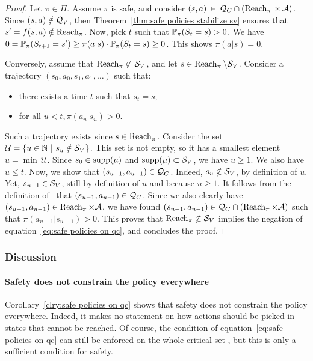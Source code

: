 \begin{proof}
	Let $\pi\in\Pi$. Assume $\pi$ is safe, and consider $(s, a)\,\in\, \QC \cap (\reach_\pi\,\times\,\A)$. Since $(s, a) \notin \QV$, then Theorem~\ref{thm:safe policies stabilize sv} ensures that $s' = f(s, a)\notin\reach_\pi$. Now, pick $t$ such that $\P_\pi(S_t = s) > 0$. We have $0 = \P_\pi(S_{t+1} = s') \geq \pi(a|s)\cdot\P_\pi(S_t = s) \geq 0$. This shows $\pi(a|s) = 0$.\par
	Conversely, assume that $\reach_\pi\not\subset\SV$, and let $s\in\reach_\pi\setminus\SV$. Consider a trajectory $(s_0, a_0, s_1, a_1, \hdots)$ such that:
	\begin{itemize}
		\item there exists a time $t$ such that $s_t = s$;
		\item for all $u < t, \pi(a_u|s_u) > 0$.
	\end{itemize}
	Such a trajectory exists since $s\in\reach_\pi$. Consider the set \mbox{$\mathcal{U} = \{u\in\mathbb{N}~|~s_u\notin\SV\}$}. This set is not empty, so it has a smallest element $u = \min\,\mathcal{U}$. Since $s_0\in\support(\mu)$ and $\support(\mu)\subset\SV$, we have $u \geq 1$. We also have $u\leq t$. Now, we show that $(s_{u-1}, a_{u-1}) \in \QC$. Indeed, $s_u\notin\SV$, by definition of $u$. Yet, $s_{u-1}\in\SV$, still by definition of $u$ and because $u \geq 1$. It follows from the definition of \QC~that $(s_{u-1}, a_{u-1})\in\QC$. Since we also clearly have $(s_{u-1}, a_{u-1})\in\reach_\pi \times \A$, we have found $(s_{u-1}, a_{u-1}) \in \QC\cap(\reach_\pi \times \A)$ such that $\pi(a_{u-1}|s_{u-1}) > 0$. This proves that $\reach_\pi\not\subset\SV$ implies the negation of equation~\eqref{eq:safe policies on qc}, and concludes the proof.
\end{proof}
\subsubsection{Discussion}
\paragraph{Safety does not constrain the policy everywhere} Corollary~\ref{clry:safe policies on qc} shows that safety does not constrain the policy everywhere. Indeed, it makes no statement on how actions should be picked in states that cannot be reached. Of course, the condition of equation~\eqref{eq:safe policies on qc} can still be enforced on the whole critical set \QC, but this is only a sufficient condition for safety.

